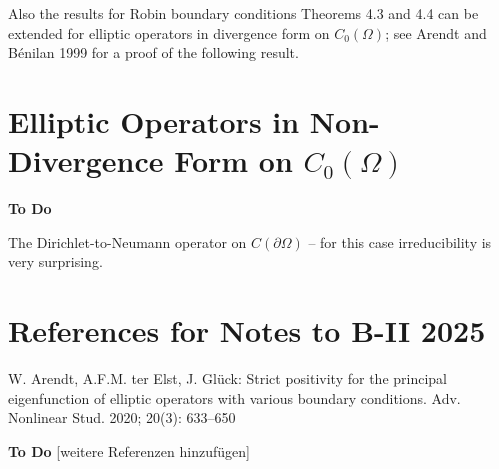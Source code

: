 \documentclass[11pt]{article}
\begin{document}
Also the results for Robin boundary conditions Theorems 4.3 and 4.4 can be extended for elliptic operators in divergence form on $C_0(\Omega)$; see Arendt and Bénilan 1999 for a proof of the following result.

\section{Elliptic Operators in Non-Divergence Form on $C_0(\Omega)$}

\textbf{To Do}

The Dirichlet-to-Neumann operator on $C(\partial\Omega)$ -- for this case irreducibility is very surprising.

\section*{References for Notes to B-II 2025}

W. Arendt, A.F.M. ter Elst, J. Glück: Strict positivity for the principal eigenfunction of elliptic operators with various boundary conditions. Adv. Nonlinear Stud. 2020; 20(3): 633--650

\textbf{To Do} [weitere Referenzen hinzufügen]
\end{document}

